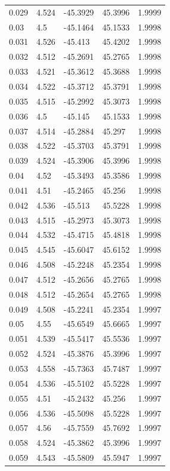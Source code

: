 \begin{tabular}{lllll}
0.029 & 4.524 & -45.3929 & 45.3996 & 1.9999 \\
0.03 & 4.5 & -45.1464 & 45.1533 & 1.9998 \\
0.031 & 4.526 & -45.413 & 45.4202 & 1.9998 \\
0.032 & 4.512 & -45.2691 & 45.2765 & 1.9998 \\
0.033 & 4.521 & -45.3612 & 45.3688 & 1.9998 \\
0.034 & 4.522 & -45.3712 & 45.3791 & 1.9998 \\
0.035 & 4.515 & -45.2992 & 45.3073 & 1.9998 \\
0.036 & 4.5 & -45.145 & 45.1533 & 1.9998 \\
0.037 & 4.514 & -45.2884 & 45.297 & 1.9998 \\
0.038 & 4.522 & -45.3703 & 45.3791 & 1.9998 \\
0.039 & 4.524 & -45.3906 & 45.3996 & 1.9998 \\
0.04 & 4.52 & -45.3493 & 45.3586 & 1.9998 \\
0.041 & 4.51 & -45.2465 & 45.256 & 1.9998 \\
0.042 & 4.536 & -45.513 & 45.5228 & 1.9998 \\
0.043 & 4.515 & -45.2973 & 45.3073 & 1.9998 \\
0.044 & 4.532 & -45.4715 & 45.4818 & 1.9998 \\
0.045 & 4.545 & -45.6047 & 45.6152 & 1.9998 \\
0.046 & 4.508 & -45.2248 & 45.2354 & 1.9998 \\
0.047 & 4.512 & -45.2656 & 45.2765 & 1.9998 \\
0.048 & 4.512 & -45.2654 & 45.2765 & 1.9998 \\
0.049 & 4.508 & -45.2241 & 45.2354 & 1.9997 \\
0.05 & 4.55 & -45.6549 & 45.6665 & 1.9997 \\
0.051 & 4.539 & -45.5417 & 45.5536 & 1.9997 \\
0.052 & 4.524 & -45.3876 & 45.3996 & 1.9997 \\
0.053 & 4.558 & -45.7363 & 45.7487 & 1.9997 \\
0.054 & 4.536 & -45.5102 & 45.5228 & 1.9997 \\
0.055 & 4.51 & -45.2432 & 45.256 & 1.9997 \\
0.056 & 4.536 & -45.5098 & 45.5228 & 1.9997 \\
0.057 & 4.56 & -45.7559 & 45.7692 & 1.9997 \\
0.058 & 4.524 & -45.3862 & 45.3996 & 1.9997 \\
0.059 & 4.543 & -45.5809 & 45.5947 & 1.9997 \\

\end{tabular}
